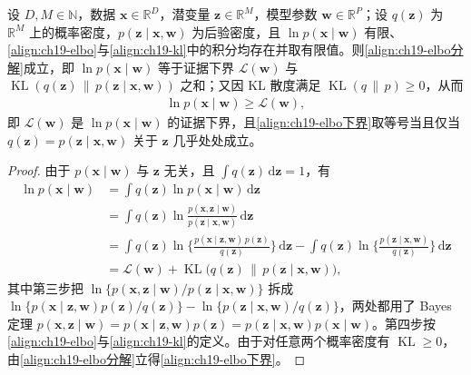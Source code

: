 \documentclass[../../main.tex]{subfiles}
\begin{document}
\begin{proposition}[证据下界分解]\label{proposition:ch19-ELBO分解}
设 $D,M\in\mathbb{N}$，数据 $\bm{x}\in\mathbb{R}^{D}$，潜变量 $\bm{z}\in\mathbb{R}^{M}$，模型参数 $\bm{w}\in\mathbb{R}^{P}$；设 $q(\bm{z})$ 为 $\mathbb{R}^{M}$ 上的概率密度，$p(\bm{z}\mid\bm{x},\bm{w})$ 为后验密度，且 $\ln p(\bm{x}\mid\bm{w})$ 有限、\eqref{align:ch19-elbo}与\eqref{align:ch19-kl}中的积分均存在并取有限值。则\eqref{align:ch19-elbo分解}成立，即 $\ln p(\bm{x}\mid\bm{w})$ 等于证据下界 $\mathcal{L}(\bm{w})$ 与 $\operatorname{KL}(q(\bm{z})\,\|\,p(\bm{z}\mid\bm{x},\bm{w}))$ 之和；又因 KL 散度满足 $\operatorname{KL}(q\,\|\,p)\geqslant0$，从而
\begin{align}
\ln p(\bm{x}\mid\bm{w})\geqslant\mathcal{L}(\bm{w}),
\label{align:ch19-elbo下界}
\end{align}
即 $\mathcal{L}(\bm{w})$ 是 $\ln p(\bm{x}\mid\bm{w})$ 的证据下界，且\eqref{align:ch19-elbo下界}取等号当且仅当 $q(\bm{z})=p(\bm{z}\mid\bm{x},\bm{w})$ 关于 $\bm{z}$ 几乎处处成立。
\end{proposition}
\begin{proof}
由于 $p(\bm{x}\mid\bm{w})$ 与 $\bm{z}$ 无关，且 $\int q(\bm{z})\,\mathrm{d}\bm{z}=1$，有
\begin{align*}
\ln p(\bm{x}\mid\bm{w})&=\int q(\bm{z})\ln p(\bm{x}\mid\bm{w})\,\mathrm{d}\bm{z}\\
&=\int q(\bm{z})\ln\frac{p(\bm{x},\bm{z}\mid\bm{w})}{p(\bm{z}\mid\bm{x},\bm{w})}\,\mathrm{d}\bm{z}\\
&=\int q(\bm{z})\ln\Big\{\frac{p(\bm{x}\mid\bm{z},\bm{w})\,p(\bm{z})}{q(\bm{z})}\Big\}\,\mathrm{d}\bm{z}-\int q(\bm{z})\ln\Big\{\frac{p(\bm{z}\mid\bm{x},\bm{w})}{q(\bm{z})}\Big\}\,\mathrm{d}\bm{z}\\
&=\mathcal{L}(\bm{w})+\operatorname{KL}\big(q(\bm{z})\,\|\,p(\bm{z}\mid\bm{x},\bm{w})\big),
\end{align*}
其中第三步把 $\ln\{p(\bm{x},\bm{z}\mid\bm{w})/p(\bm{z}\mid\bm{x},\bm{w})\}$ 拆成 $\ln\{p(\bm{x}\mid\bm{z},\bm{w})p(\bm{z})/q(\bm{z})\}-\ln\{p(\bm{z}\mid\bm{x},\bm{w})/q(\bm{z})\}$，两处都用了 Bayes 定理 $p(\bm{x},\bm{z}\mid\bm{w})=p(\bm{x}\mid\bm{z},\bm{w})p(\bm{z})=p(\bm{z}\mid\bm{x},\bm{w})p(\bm{x}\mid\bm{w})$。第四步按\eqref{align:ch19-elbo}与\eqref{align:ch19-kl}的定义。由于对任意两个概率密度有 $\operatorname{KL}\geqslant0$，由\eqref{align:ch19-elbo分解}立得\eqref{align:ch19-elbo下界}。
\end{proof}
\end{document}
